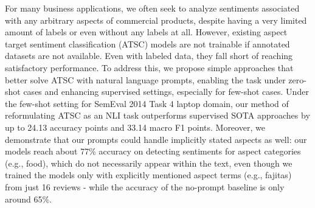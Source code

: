 For many business applications, we often seek to analyze sentiments associated with any arbitrary aspects of commercial products, despite having a very limited amount of labels or even without any labels at all. However, existing aspect target sentiment classification (ATSC) models are not trainable if annotated datasets are not available. Even with labeled data, they fall short of reaching satisfactory performance. To address this, we propose simple approaches that better solve ATSC with natural language prompts, enabling the task under zero-shot cases and enhancing supervised settings, especially for few-shot cases. Under the few-shot setting for SemEval 2014 Task 4 laptop domain, our method of reformulating ATSC as an NLI task outperforms supervised SOTA approaches by up to 24.13 accuracy points and 33.14 macro F1 points. Moreover, we demonstrate that our prompts could handle implicitly stated aspects as well: our models reach about 77\% accuracy on detecting sentiments for aspect categories (e.g., food), which do not necessarily appear within the text, even though we trained the models only with explicitly mentioned aspect terms (e.g., fajitas) from just 16 reviews - while the accuracy of the no-prompt baseline is only around 65\%.
